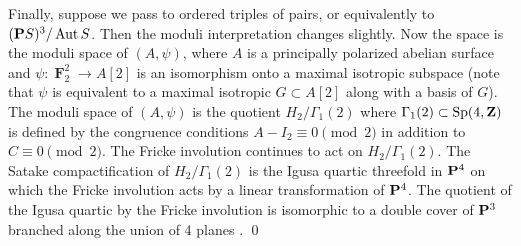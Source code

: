 \documentclass{amsart}
\providecommand {\Z}{{\bf Z}}
\renewcommand {\P}{{\bf P}}
\providecommand {\from}{{\colon}}
\providecommand{\Aut}{\operatorname{Aut}}
\numberwithin{equation}{section}
\DeclareMathOperator{\F}{\mathbf F}
\begin{document}
\begin{remark}
  Finally, suppose we pass to ordered triples of pairs, or equivalently to $(\P S)^3 / \Aut S$.
  Then the moduli interpretation changes slightly.
  Now the space is the moduli space of $(A, \psi)$, where $A$ is a principally polarized abelian surface and $\psi \from \F_2^2 \to A[2]$ is an isomorphism onto a maximal isotropic subspace (note that $\psi$ is equivalent to a maximal isotropic $G \subset A[2]$ along with a basis of $G$).
  The moduli space of $(A, \psi)$ is the quotient $H_2 / \Gamma_1(2)$ where $\Gamma_1(2) \subset \operatorname{Sp}(4, \Z)$ is defined by the congruence conditions $A - I_2 \equiv 0 \pmod 2$ in addition to $C \equiv 0 \pmod 2$.
  The Fricke involution continues to act on $H_2 / \Gamma_1(2)$.
  The Satake compactification of $H_2 / \Gamma_1(2)$ is the Igusa quartic threefold in $\P^4$ on which the Fricke involution acts by a linear transformation of $\P^4$.
  The quotient of the Igusa quartic by the Fricke involution is isomorphic to a double cover of $\P^3$ branched along the union of 4 planes  \cite[Theorem~2]{muk:12}.
  \qed
\end{remark}
\end{document}
